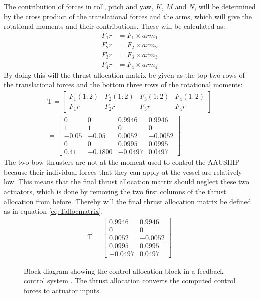 The contribution of forces in roll, pitch and yaw, $K$, $M$ and $N$, will be determined by the cross product of the translational forces and the arms, which will give the rotational moments and their contributions. These will be calculated as:
\begin{align}
F_1r &= F_1\times arm_1\\
F_2r &= F_2\times arm_2\\
F_3r &= F_3\times arm_3\\
F_4r &= F_4\times arm_4
\end{align}
By doing this will the thrust allocation matrix be given as the top two rows of the translational forces and the bottom three rows of the rotational moments:
\begin{align}
\text{T} =
\begin{bmatrix}
F_1(1:2) & F_2(1:2) & F_3(1:2) & F_4(1:2) \\
F_1r & F_2r & F_3r & F_4r
\end{bmatrix}\\
=
\begin{bmatrix}
0 & 0 & 0.9946 & 0.9946 \\
1 & 1 & 0 & 0 \\
-0.05 & -0.05 & 0.0052 & -0.0052 \\
0 & 0 & 0.0995 & 0.0995 \\
0.41 & -0.1800 & -0.0497 & 0.0497
\end{bmatrix}
\end{align}
The two bow thrusters are not at the moment used to control the AAUSHIP because their individual forces that they can apply at the vessel are relatively low. This means that the final thrust allocation matrix should neglect these two actuators, which is done by removing the two first columns of the thrust allocation from before. Thereby will the final thrust allocation matrix be defined as in equation \ref{eq:Tallocmatrix}.
\begin{align}
\text{T} =
\begin{bmatrix}
0.9946 & 0.9946 \\
0 & 0 \\
0.0052 & -0.0052 \\
0.0995 & 0.0995 \\
-0.0497 & 0.0497
\end{bmatrix}
\label{eq:Tallocmatrix}
\end{align}

\begin{figure}[htbp]
\centering

\caption{Block diagram showing the control allocation block in a
feedback control system \citep[fig.12.25]{fossen}. The thrust
allocation converts the computed control forces to actuator inputs.}
\label{fig:thrust_allocation_block}
\end{figure}
